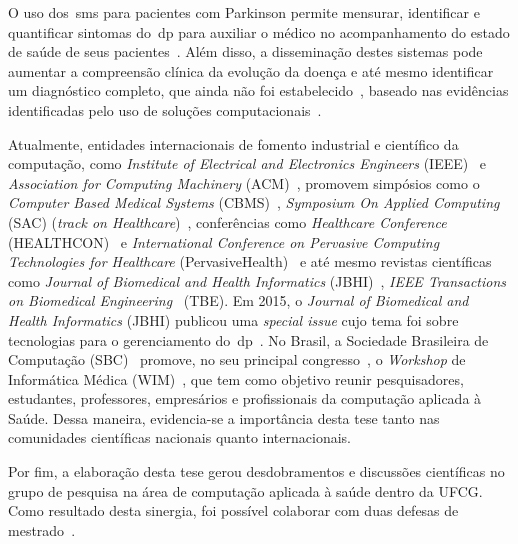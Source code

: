 O uso dos~\ac{sms} para pacientes com Parkinson permite mensurar, identificar e quantificar sintomas do~\ac{dp} para auxiliar o médico no acompanhamento do estado de saúde de seus pacientes~\cite{bradmonitor2015}. Além disso, a disseminação destes sistemas pode aumentar a compreensão clínica da evolução da doença e até mesmo identificar um diagnóstico completo, que ainda não foi estabelecido~\cite{parkinsondiag2015}, baseado nas evidências identificadas pelo uso de soluções computacionais~\cite{compapproachparkinson2015}. 







Atualmente, entidades internacionais de fomento industrial e científico da computação, como \textit{Institute of Electrical and Electronics Engineers} (IEEE)~\cite{ieee2016} e \textit{Association for Computing Machinery} (ACM)~\cite{acm2016}, promovem simpósios como o \textit{Computer Based Medical Systems} (CBMS)~\cite{cbms2016}, \textit{Symposium On Applied Computing} (SAC) (\textit{track on Healthcare})~\cite{sachealth2016}, conferências como \textit{Healthcare Conference} (HEALTHCON)~\cite{healthcon2016} e \textit{International Conference on Pervasive Computing Technologies for Healthcare} (PervasiveHealth)~\cite{pervasivehealth2016} e até mesmo revistas científicas como \textit{Journal of Biomedical and Health Informatics} (JBHI)~\cite{jbhi2016}, \textit{IEEE Transactions on Biomedical Engineering}~\cite{tbe2016} (TBE). Em 2015, o \textit{Journal of Biomedical and Health Informatics} (JBHI) publicou uma \textit{special issue} cujo tema foi sobre tecnologias para o gerenciamento do~\ac{dp}~\cite{specjbhi2015}. No Brasil, a Sociedade Brasileira de Computação (SBC)~\cite{sbc2016} promove, no seu principal congresso~\cite{csbc2016}, o \textit{Workshop} de Informática Médica (WIM)~\cite{wim2016}, que tem como objetivo reunir pesquisadores, estudantes, professores, empresários e profissionais da computação aplicada à Saúde. Dessa maneira, evidencia-se a importância desta tese tanto nas comunidades científicas nacionais quanto internacionais.


Por fim, a elaboração desta tese gerou desdobramentos e discussões científicas no grupo de pesquisa na área de computação aplicada à saúde dentro da UFCG. Como resultado desta sinergia, foi possível colaborar com duas defesas de mestrado~\cite{antonio2013,gustavo2014}. 





